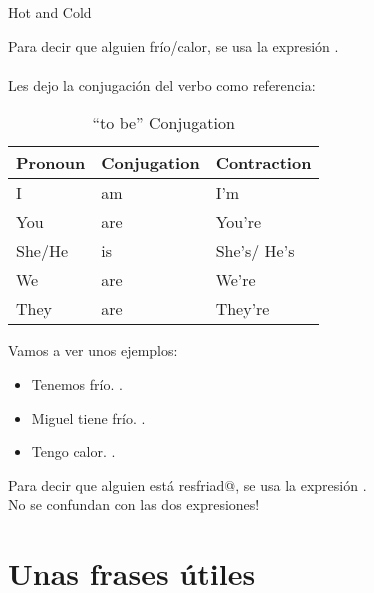 \begin{conf}{Hot and Cold}

Para decir que alguien  fr\'io/calor, se usa la
expresi\'on .\\ \\

Les dejo la conjugaci\'on del verbo  como referencia:\\

\begin{table}[H]
	\centering
	\begin{tabular}{lll}
	\toprule
		\textbf{Pronoun} & \textbf{Conjugation} & \textbf{Contraction}\\
	\midrule
		I & am & I'm\\
		You & are & You're \\
		She/He & is & She's/ He's\\
		We & are & We're \\
		They & are & They're \\
	\bottomrule
	\end{tabular}
	\caption{``to be'' Conjugation}
\end{table}

Vamos a ver unos ejemplos:
	\begin{itemize}
		\item Tenemos fr\'io. \arr {}.
		\item Miguel tiene fr\'io. \arr {}.
		\item Tengo calor. \arr {}.
	\end{itemize}

Para decir que alguien est\'a resfriad@, se usa la expresi\'on
.\\

\textexclamdown No se confundan con las dos expresiones!
\end{conf}

\section{Unas frases \'utiles}

